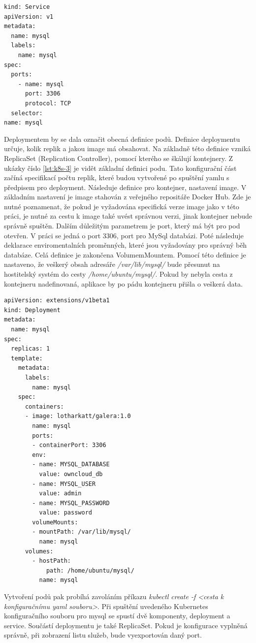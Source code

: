 \begin{lstlisting}[caption={Ukázka konfigurace Kubernetes komponent, část 2},label= {lst:k8s-2}]
kind: Service
apiVersion: v1
metadata:
  name: mysql
  labels:
    name: mysql
spec:
  ports:
    - name: mysql
      port: 3306
      protocol: TCP
  selector:
name: mysql
\end{lstlisting}

Deploymentem by se dala označit obecná definice podů. Definice deploymentu určuje, kolik replik a jakou image má obsahovat. Na základně této definice vzniká ReplicaSet (Replication Controller), pomocí kterého se škálují kontejnery. Z ukázky číslo \ref{lst:k8s-3} je vidět základní definici podu. Tato konfigurační část začíná specifikací počtu replik, které budou vytvořené po spuštění yamlu s předpisem pro deployment. Následuje definice pro kontejner,  nastavení image. V základním nastavení je image stahován z veřejného repositáře Docker Hub. Zde je nutné poznamenat, že pokud je vyžadována specifická verze image jako v této práci, je nutné za cestu k image také uvést správnou verzi, jinak kontejner nebude správně spuštěn. Dalším důležitým parametrem je port, který má být pro pod otevřen. V práci se jedná o port 3306, port pro MySql databázi. Poté následuje deklarace enviromentalních proměnných, které jsou vyžadovány pro správný běh databáze. Celá definice je zakončena VolumemMountem. Pomocí této definice je nastaveno, že veškerý obsah adresáře \textit{/var/lib/mysql/} bude přesunut na hostitelský systém do cesty \textit{/home/ubuntu/mysql/}. Pokud by nebyla cesta z kontejneru nadefinovaná, aplikace by po pádu kontejneru přišla o veškerá data. 

\begin{lstlisting}[caption={Ukázka konfigurace Kubernetes komponent, část 3},label= {lst:k8s-3}]
apiVersion: extensions/v1beta1
kind: Deployment
metadata:
  name: mysql
spec:
  replicas: 1
  template:
    metadata:
      labels:
        name: mysql
    spec:
      containers:
      - image: lotharkatt/galera:1.0
        name: mysql
        ports:
        - containerPort: 3306
        env:
        - name: MYSQL_DATABASE
          value: owncloud_db
        - name: MYSQL_USER
          value: admin
        - name: MYSQL_PASSWORD
          value: password 
        volumeMounts:
        - mountPath: /var/lib/mysql/
          name: mysql
      volumes:
        - hostPath:
            path: /home/ubuntu/mysql/
	      name: mysql
\end{lstlisting}

Vytvoření podů pak probíhá zavoláním příkazu \textit{kubectl create -f <cesta k konfiguračnímu yaml souboru>}.  Při spuštění uvedeného Kubernetes konfiguračního souboru pro mysql se spustí dvě komponenty, deployment a service. Součástí deploymentu je také ReplicaSet. Pokud je konfigurace vyplněná správně, při zobrazení listu služeb, bude vyexportován daný port.

